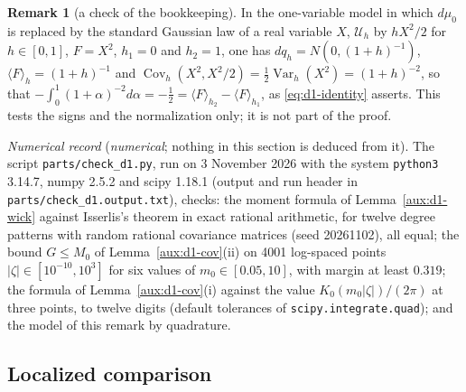 \documentclass[11pt,a4paper]{article}
\theoremstyle{plain}
\theoremstyle{definition}
\theoremstyle{plain}
\theoremstyle{definition}
\newtheorem{auxrem}[auxlemma]{Remark}
\DeclareMathOperator{\Cov}{Cov}
\newcommand{\ev}[2]{\langle #1\rangle_{#2}}            %
\newcommand{\Uc}{\mathcal U}
\newcommand{\dmu}{d\mu_0}
\begin{document}
\begin{auxrem}[a check of the bookkeeping]\label{aux:d1-check}
In the one-variable model in which $\dmu$ is replaced by the standard Gaussian law of a real
variable $X$, $\Uc_h$ by $hX^2/2$ for $h\in[0,1]$, $F=X^2$, $h_1=0$ and $h_2=1$, one has
$dq_h=N(0,(1+h)^{-1})$, $\ev{F}{h}=(1+h)^{-1}$ and
$\Cov_h(X^2,X^2/2)=\frac12\operatorname{Var}_h(X^2)=(1+h)^{-2}$, so that
$-\int_0^1(1+\alpha)^{-2}d\alpha=-\frac12=\ev{F}{h_2}-\ev{F}{h_1}$, as \eqref{eq:d1-identity}
asserts. This tests the signs and the normalization only; it is not part of the proof.

\emph{Numerical record} (\emph{numerical}; nothing in this section is deduced from it).  The script
\texttt{parts/check\_d1.py}, run on 3 November 2026 with the system \texttt{python3} 3.14.7, numpy
2.5.2 and scipy 1.18.1 (output and run header in \texttt{parts/}\allowbreak\texttt{check\_d1.output.txt}), checks: the moment
formula of Lemma~\ref{aux:d1-wick} against Isserlis's theorem in exact rational arithmetic, for
twelve degree patterns with random rational covariance matrices (seed 20261102), all equal; the
bound $G\le M_0$ of Lemma~\ref{aux:d1-cov}(ii) on 4001 log-spaced points
$|\zeta|\in[10^{-10},10^3]$ for six values of $m_0\in[0.05,10]$, with margin at least $0.319$; the
formula of Lemma~\ref{aux:d1-cov}(i) against the value $K_0(m_0|\zeta|)/(2\pi)$ at three points, to
twelve digits (default tolerances of \texttt{scipy.integrate.quad}); and the model of this remark by
quadrature.
\end{auxrem}

\subsection{Localized comparison}\label{sec:d2}
\end{document}
